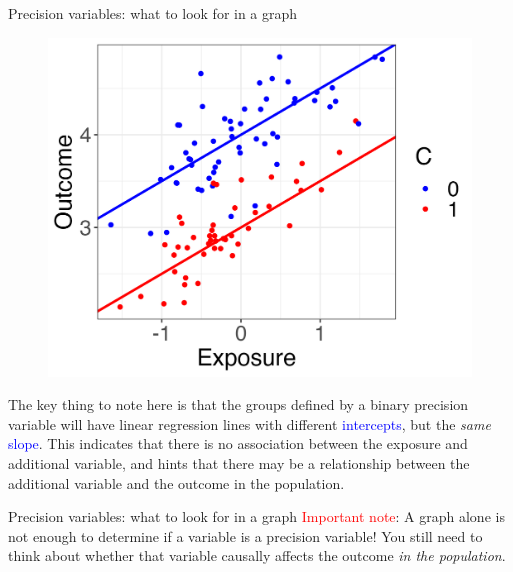 \documentclass[10pt,t]{beamer}
\begin{document}
\begin{frame}{Precision variables: what to look for in a graph}
	\vspace{-0.5cm}
\begin{figure}
	\centering \includegraphics[scale=0.4]{p7.png}
\end{figure}

\vspace{0.3cm}

The key thing to note here is that the groups defined by a binary precision variable will have linear regression lines with different \textcolor{blue}{intercepts}, but the \textit{same} \textcolor{blue}{slope}. This indicates that there is no association between the exposure and additional variable, and hints that there may be a relationship between the additional variable and the outcome in the population. 
\end{frame}

\begin{frame}{Precision variables: what to look for in a graph}
\textcolor{red}{Important note}: A graph alone is not enough to determine if a variable is a precision variable! You still need to think about whether that variable causally affects the outcome \textit{in the population}.
\end{frame}
\end{document}
